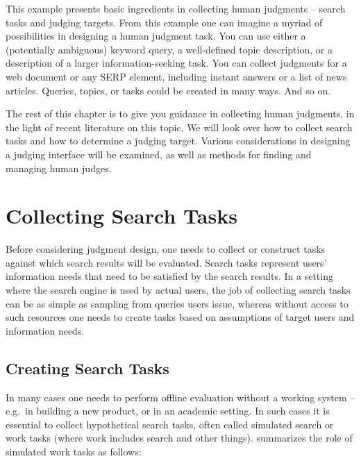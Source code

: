 This example presents basic ingredients in collecting human judgments -- search tasks and judging targets. From this example one can imagine a myriad of possibilities in designing a human judgment task. You can use either a (potentially ambiguous) keyword query, a well-defined topic description, or a description of a larger information-seeking task. You can collect judgments for a web document or any SERP element, including instant answers or a list of news articles. Queries, topics, or tasks could be created in many ways. And so on.

The rest of this chapter is to give you guidance in collecting human judgments, in the light of recent literature on this topic. We will look over how to collect search tasks and how to determine a judging target. Various considerations in designing a judging interface will be examined, as well as methods for finding and managing human judges.



\section{Collecting Search Tasks}
Before considering judgment design, one needs to collect or construct tasks against which search results will be evaluated. Search tasks represent users' information needs that need to be satisfied by the search results. In a setting where the search engine is used by actual users, the job of collecting search tasks can be as simple as sampling from queries users issue, whereas without access to such resources one needs to create tasks based on assumptions of target users and information needs. 

\subsection{Creating Search Tasks}
In many cases one needs to perform offline evaluation without a working system -- e.g.\ in building a new product, or in an academic setting. In such cases it is essential to collect hypothetical search tasks, often called simulated search or work tasks (where work includes search and other things). \cite{Borlund:2003} summarizes the role of simulated work tasks as follows:

